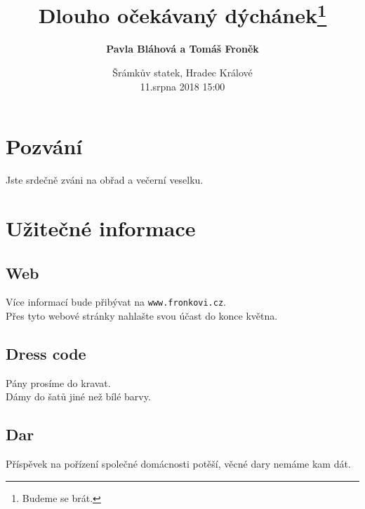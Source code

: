 \documentclass[7pt, a6paper]{article}
\title{\textbf{Dlouho očekávaný dýchánek}\thanks{Budeme se brát.}}
\author{\textbf{Pavla Bláhová a Tomáš Froněk}}
\date{Šrámkův statek, Hradec Králové\\ 11.srpna 2018 15:00}
\begin{document}

\maketitle
\section{Pozvání}
Jste srdečně zváni na obřad a večerní veselku.
\section{Užitečné informace}
\subsection{Web}
Více informací bude přibývat na \texttt{www.fronkovi.cz}. \\
Přes tyto webové stránky nahlašte svou účast do konce května.
\subsection{Dress code}
Pány prosíme do kravat. \\
Dámy do šatů jiné než bílé barvy.
\subsection{Dar}
Příspěvek na pořízení společné domácnosti potěší, věcné dary nemáme kam dát.
\end{document}

